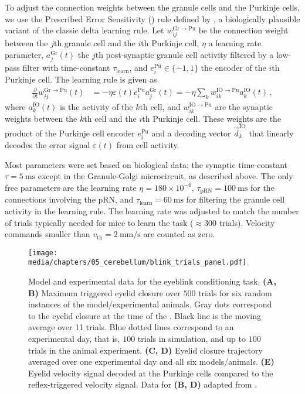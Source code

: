 To adjust the connection weights between the granule cells and the Purkinje cells, we use the Prescribed Error Sensitivity (\PES) rule defined by \citet{macneil2011finetuning}, a biologically plausible variant of the classic delta learning rule.
Let $w^{\mathrm{Gr}\to\mathrm{Pu}}_{ij}$ be the connection weight between the $j$th granule cell and the $i$th Purkinje cell, $\eta$ a learning rate parameter, $a^\mathrm{Gr}_j(t)$ the $j$th post-synaptic granule cell activity filtered by a low-pass filter with time-constant $\tau_\mathrm{learn}$, and $e^\mathrm{Pu}_i \in \{-1, 1\}$ the encoder of the $i$th Purkinje cell.
The \PES learning rule is given as
\begin{align*}
	\frac{\partial}{\partial t} w^{\mathrm{Gr}\to\mathrm{Pu}}_{ij}(t) &= -\eta \varepsilon(t) e^\mathrm{Pu}_i a^\mathrm{Gr}_j(t) = -\eta \sum_{k} w^{\mathrm{IO}\to\mathrm{Pu}}_{ik} a^\mathrm{IO}_k(t) \,,
\end{align*}
where $a^\mathrm{IO}_k(t)$ is the activity of the $k$th \IO cell, and $w^{\mathrm{IO}\to\mathrm{Pu}}_{ik}$ are the synaptic weights between the $k$th \IO cell and the $i$th Purkinje cell.
These weights are the product of the Purkinje cell encoder $e_i^\mathrm{Pu}$ and a decoding vector $\vec d_k^\mathrm{IO}$ that linearly decodes the error signal $\varepsilon(t)$ from \IO cell activity.

Most parameters were set based on biological data; the synaptic time-constant $\tau = \SI{5}{\milli\second}$ except in the Granule-Golgi microcircuit, as described above.
The only free parameters are the learning rate $\eta=180\times 10^{-6}$, $\tau_\mathrm{pRN} = \SI{100}{\milli\second}$ for the connections involving the pRN, and $\tau_\mathrm{learn} = \SI{60}{\milli\second}$ for filtering the granule cell activity in the learning rule.
The learning rate was adjusted to match the number of trials typically needed for mice to learn the task ($\approx 300$ trials).
Velocity commands smaller than $v_\mathrm{th} = \SI{2}{\milli\metre\per\second}$ are counted as zero.

\begin{figure}
	\centering%
	\texttt{[image: media/chapters/05\_cerebellum/blink\_trials\_panel.pdf]}
	\caption[Model and experimental data for the eyeblink conditioning task]{Model and experimental data for the eyeblink conditioning task. \textbf{(A, B)} Maximum \CR triggered eyelid closure over $500$ trials for six random instances of the model/experimental animals. Gray dots correspond to the eyelid closure at the time of the \US. Black line is the moving average over 11 trials. Blue dotted lines correspond to an experimental day, that is, $100$ trials in simulation, and up to $100$ trials in the animal experiment. \textbf{(C, D)} Eyelid closure trajectory averaged over one experimental day and all six models/animals. \textbf{(E)} Eyelid velocity signal decoded at the Purkinje cells compared to the reflex-triggered velocity signal. Data for \textbf{(B, D)} adapted from \protect\citet{heiney2014cerebellardependent}.}
	\label{fig:result-basic}
\end{figure}

